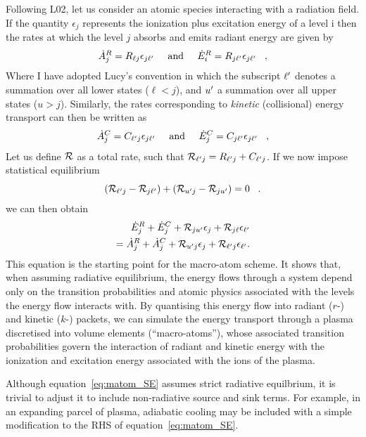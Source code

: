 Following L02, let us consider an atomic species interacting with a radiation field.
If the quantity $\epsilon_j$ represents the ionization plus excitation energy of 
a level i then the rates at which the level $j$ absorbs and emits radiant energy 
are given by
\begin{equation}
 \dot{A}_{j}^{R} = R_{\ell j} \epsilon_{j {\ell^\prime}} \;\;\;\;\; {\rm and} \;\;\;
\;\;  \dot{E}_{i}^{R} = R_{j {\ell^\prime}} \epsilon_{j {\ell^\prime}} \;\;\; ,
\end{equation}
Where I have adopted Lucy's convention in which the subscript 
${\ell^\prime}$ denotes a summation over all lower states ($\ell<j$), and
${u^\prime}$ a summation over all upper states ($u>j$).
Similarly, the rates corresponding to {\em kinetic} (collisional)
energy transport can then be written as
\begin{equation}
 \dot{A}_{j}^{C} = C_{{\ell^\prime} j} \epsilon_{j {\ell^\prime}} \;\;\;\;\; {\rm and}
\;\;\;
\;\;  \dot{E}_{j}^{C} = C_{j {\ell^\prime}} \epsilon_{j {\ell^\prime}} \;\;\; ,
\end{equation}
Let us define ${\cal R}$ as a total rate, such that
${\cal R}_{{\ell^\prime} j}  = R_{{\ell^\prime} j} + C_{{\ell^\prime} j}$.
If we now impose statistical equilibrium
%
\begin{equation}
 ({\cal R}_{{\ell^\prime} j}-{\cal R}_{j {\ell^\prime}})+({\cal R}_{{u^\prime} j}-{\cal R}_{j{u^\prime}})=0 \;\;\;.
\end{equation}
we can then obtain 
\begin{eqnarray}
 \dot{E}_{j}^{R}+\dot{E}_{j}^{C}+{\cal R}_{j{u^\prime}}\epsilon_{j}+
 {\cal R}_{j \ell}\epsilon_{{\ell^\prime}}  \nonumber \\  
 = \dot{A}_{j}^{R}+\dot{A}_{j}^{C}+{\cal R}_{{u^\prime} j} \epsilon_{j}
 +{\cal R}_{{\ell^\prime} j} \epsilon_{{\ell^\prime}}           .  
 \label{eq:matom_SE}     
\end{eqnarray}
This equation is the starting point for the macro-atom scheme. It shows 
that, when assuming radiative equilibrium, the energy flows through
a system depend only on the transition probabilities and atomic physics
associated with the levels the energy flow interacts with.
By quantising this energy flow into radiant ($r$-) and kinetic ($k$-) packets, 
we can simulate the energy transport through
a plasma discretised into volume elements (``macro-atoms''),
whose associated transition probabilities govern the interaction 
of radiant and kinetic energy with the ionization and excitation energy associated 
with the ions of the plasma.

Although equation~\ref{eq:matom_SE} assumes strict radiative equilbrium,
it is trivial to adjust it to include non-radiative source and sink terms. 
For example, in an expanding parcel of plasma, adiabatic cooling may be 
included with a simple modification to the RHS of equation~\ref{eq:matom_SE}.


